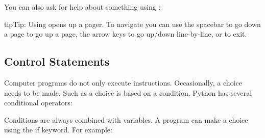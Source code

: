 \begin{sphinxVerbatim}[commandchars=\\\{\}]
\end{sphinxVerbatim}

You can also ask for help about something using :

\begin{sphinxVerbatim}[commandchars=\\\{\}]
\end{sphinxVerbatim}

\begin{sphinxadmonition}{tip}{Tip:}
Using  opens up a pager. To navigate you can use the
spacebar to go down a page  to go up a page, the arrow keys to
go up/down line-by-line, or  to exit.
\end{sphinxadmonition}


\subsection{Control Statements}
\label{\detokenize{lesson/prg/python_intro:control-statements}}
Computer programs do not only execute instructions. Occasionally, a
choice needs to be made. Such as a choice is based on a
condition. Python has several conditional operators:

\begin{sphinxVerbatim}[commandchars=\\\{\}]
    
    
  
   
\end{sphinxVerbatim}

Conditions are always combined with variables. A program can make a
choice using the if keyword. For example:

